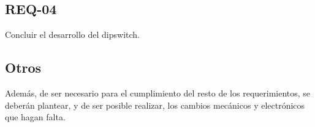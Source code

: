 \subsection{REQ-04}
Concluir el desarrollo del dipswitch.
\subsection{Otros}
Además, de ser necesario para el cumplimiento del resto de los requerimientos, se deberán plantear, y de ser posible realizar, los cambios mecánicos y electrónicos que hagan falta.








